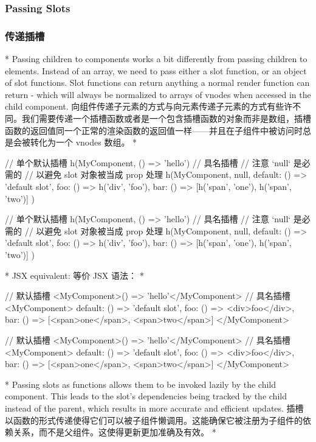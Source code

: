 \begin{paracol}{2}
\subsubsection{Passing Slots}
\switchcolumn
\subsubsection{传递插槽}
\switchcolumn[0]*%
Passing children to components works a bit differently from passing
children to elements. Instead of an array, we need to pass either a slot
function, or an object of slot functions. Slot functions can return
anything a normal render function can return - which will always be
normalized to arrays of vnodes when accessed in the child component.
\switchcolumn
向组件传递子元素的方式与向元素传递子元素的方式有些许不同。我们需要传递一个插槽函数或者是一个包含插槽函数的对象而非是数组，插槽函数的返回值同一个正常的渲染函数的返回值一样------并且在子组件中被访问时总是会被转化为一个
vnodes 数组。
\switchcolumn[0]*%
\begin{codeJs}
// 单个默认插槽
h(MyComponent, () => 'hello')
// 具名插槽
// 注意 `null` 是必需的
// 以避免 slot 对象被当成 prop 处理
h(MyComponent, null, {
    default: () => 'default slot',
    foo: () => h('div', 'foo'),
    bar: () => [h('span', 'one'), h('span', 'two')]
})
\end{codeJs}
\switchcolumn
\begin{codeJs}
// 单个默认插槽
h(MyComponent, () => 'hello')
// 具名插槽
// 注意 `null` 是必需的
// 以避免 slot 对象被当成 prop 处理
h(MyComponent, null, {
    default: () => 'default slot',
    foo: () => h('div', 'foo'),
    bar: () => [h('span', 'one'), h('span', 'two')]
})
\end{codeJs}
\switchcolumn[0]*%
JSX equivalent:
\switchcolumn
等价 JSX 语法：
\switchcolumn[0]*%
\begin{codeHtml}
// 默认插槽
<MyComponent>{() => 'hello'}</MyComponent>
// 具名插槽
<MyComponent>{{
  default: () => 'default slot',
  foo: () => <div>foo</div>,
  bar: () => [<span>one</span>, <span>two</span>]
}}</MyComponent>
\end{codeHtml}
\switchcolumn
\begin{codeHtml}
// 默认插槽
<MyComponent>{() => 'hello'}</MyComponent>
// 具名插槽
<MyComponent>{{
  default: () => 'default slot',
  foo: () => <div>foo</div>,
  bar: () => [<span>one</span>, <span>two</span>]
}}</MyComponent>
\end{codeHtml}
\switchcolumn[0]*%
Passing slots as functions allows them to be invoked lazily by the child
component. This leads to the slot's dependencies being tracked by the
child instead of the parent, which results in more accurate and
efficient updates.
\switchcolumn
插槽以函数的形式传递使得它们可以被子组件懒调用。这能确保它被注册为子组件的依赖关系，而不是父组件。这使得更新更加准确及有效。
\switchcolumn[0]*%

\end{paracol}
